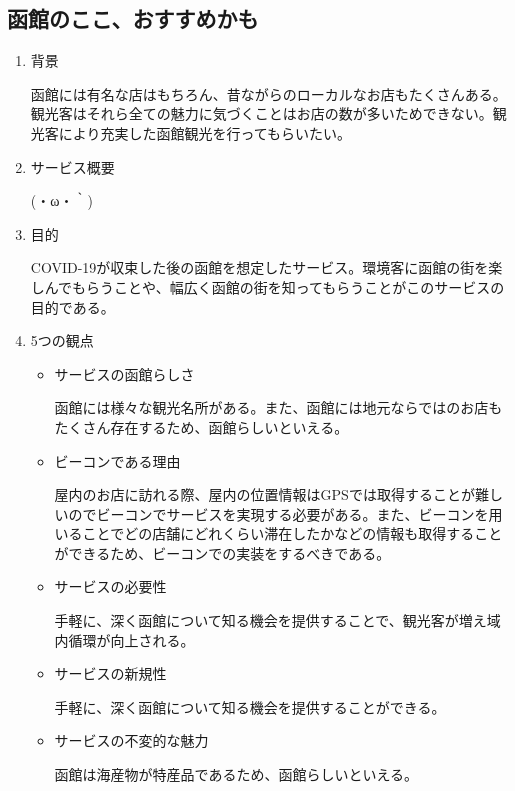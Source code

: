 \subsection{函館のここ、おすすめかも}
\begin{enumerate}
    \item 背景
    \par 函館には有名な店はもちろん、昔ながらのローカルなお店もたくさんある。観光客はそれら全ての魅力に気づくことはお店の数が多いためできない。観光客により充実した函館観光を行ってもらいたい。
    \item サービス概要
    \par (・ω・｀)
    \item 目的
    \par COVID-19が収束した後の函館を想定したサービス。環境客に函館の街を楽しんでもらうことや、幅広く函館の街を知ってもらうことがこのサービスの目的である。
    \item 5つの観点
    \begin{itemize}
        \item サービスの函館らしさ
        \par 函館には様々な観光名所がある。また、函館には地元ならではのお店もたくさん存在するため、函館らしいといえる。
        \item ビーコンである理由
        \par 屋内のお店に訪れる際、屋内の位置情報はGPSでは取得することが難しいのでビーコンでサービスを実現する必要がある。また、ビーコンを用いることでどの店舗にどれくらい滞在したかなどの情報も取得することができるため、ビーコンでの実装をするべきである。
        \item サービスの必要性
        \par 手軽に、深く函館について知る機会を提供することで、観光客が増え域内循環が向上される。
        \item サービスの新規性
        \par 手軽に、深く函館について知る機会を提供することができる。
        \item サービスの不変的な魅力
        \par 函館は海産物が特産品であるため、函館らしいといえる。
    \end{itemize}
\end{enumerate}

